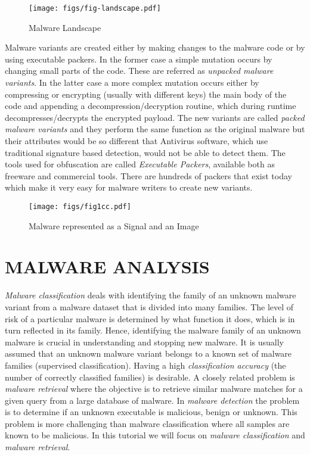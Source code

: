 \documentclass[journal]{IEEEtran}
\begin{document}
\begin{figure}[t]
\centering
{\texttt{[image: figs/fig-landscape.pdf]}}
\vspace{-10pt}
\caption{Malware Landscape}
\label{fig-landscape}
\vspace{-20pt}
\end{figure}

 Malware variants are created either by making changes to the malware code or by using executable packers.
In the former case a simple mutation occurs by changing small parts of the code. 
These are referred as \emph{unpacked malware variants}.
In the latter case a more complex mutation occurs either by compressing or encrypting (usually with different keys) the main body of the code and appending a decompression/decryption routine, which during runtime decompresses/decrypts the encrypted payload.
The new variants are called \emph{packed malware variants} and they perform the same function as the original malware but their attributes would be so different that Antivirus software, which use traditional signature based detection, would not be able to detect them.
The tools used for obfuscation are called \emph{Executable Packers}, available both as freeware and commercial tools.
There are hundreds of packers that exist today which make it very easy for malware writers to create new variants.

\begin{figure*}[t]
\centering
{\texttt{[image: figs/fig1cc.pdf]}}
\vspace{-10pt}
\caption{Malware represented as a Signal and an Image}
\label{fig1}
\vspace{-10pt}
\end{figure*}

\section*{MALWARE ANALYSIS}



\emph{Malware classification} deals with identifying the family of an unknown malware variant from a malware dataset that is divided into many families. The level of risk of a particular malware is determined by what function it does, which is in turn reflected in its family.
Hence, identifying the malware family of an unknown malware is crucial in understanding and stopping new malware.
It is usually assumed that an unknown malware variant belongs to a known set of malware families (supervised classification).
Having a high \emph{classification accuracy} (the number of correctly classified families) is desirable.
A closely related problem is \emph{malware retrieval} where the objective is to retrieve similar malware matches for a given query from a large database of malware.
In \emph{malware detection} the problem is to determine if an unknown executable is malicious, benign or unknown. This problem is more challenging than malware classification where all samples are known to be malicious.
In this tutorial we will focus on \emph{malware classification} and \emph{malware retrieval}.
\end{document}
